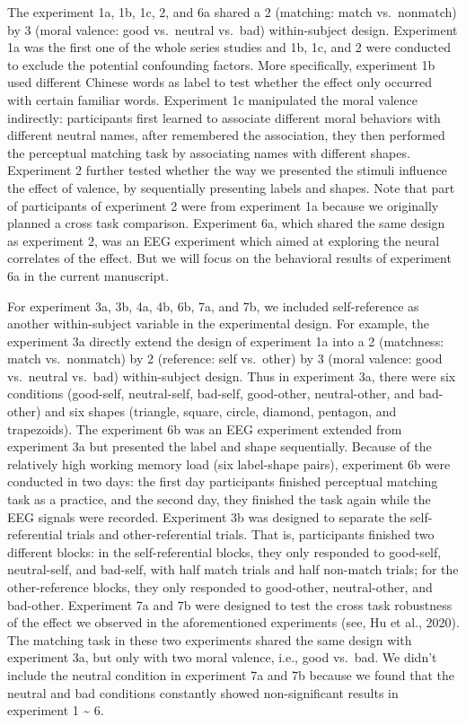 \documentclass[
  english,
  man]{apa6}
\begin{document}
The experiment 1a, 1b, 1c, 2, and 6a shared a 2 (matching: match vs.~nonmatch) by 3 (moral valence: good vs.~neutral vs.~bad) within-subject design. Experiment 1a was the first one of the whole series studies and 1b, 1c, and 2 were conducted to exclude the potential confounding factors. More specifically, experiment 1b used different Chinese words as label to test whether the effect only occurred with certain familiar words. Experiment 1c manipulated the moral valence indirectly: participants first learned to associate different moral behaviors with different neutral names, after remembered the association, they then performed the perceptual matching task by associating names with different shapes. Experiment 2 further tested whether the way we presented the stimuli influence the effect of valence, by sequentially presenting labels and shapes. Note that part of participants of experiment 2 were from experiment 1a because we originally planned a cross task comparison. Experiment 6a, which shared the same design as experiment 2, was an EEG experiment which aimed at exploring the neural correlates of the effect. But we will focus on the behavioral results of experiment 6a in the current manuscript.

For experiment 3a, 3b, 4a, 4b, 6b, 7a, and 7b, we included self-reference as another within-subject variable in the experimental design. For example, the experiment 3a directly extend the design of experiment 1a into a 2 (matchness: match vs.~nonmatch) by 2 (reference: self vs.~other) by 3 (moral valence: good vs.~neutral vs.~bad) within-subject design. Thus in experiment 3a, there were six conditions (good-self, neutral-self, bad-self, good-other, neutral-other, and bad-other) and six shapes (triangle, square, circle, diamond, pentagon, and trapezoids). The experiment 6b was an EEG experiment extended from experiment 3a but presented the label and shape sequentially. Because of the relatively high working memory load (six label-shape pairs), experiment 6b were conducted in two days: the first day participants finished perceptual matching task as a practice, and the second day, they finished the task again while the EEG signals were recorded. Experiment 3b was designed to separate the self-referential trials and other-referential trials. That is, participants finished two different blocks: in the self-referential blocks, they only responded to good-self, neutral-self, and bad-self, with half match trials and half non-match trials; for the other-reference blocks, they only responded to good-other, neutral-other, and bad-other. Experiment 7a and 7b were designed to test the cross task robustness of the effect we observed in the aforementioned experiments (see, Hu et al., 2020). The matching task in these two experiments shared the same design with experiment 3a, but only with two moral valence, i.e., good vs.~bad. We didn't include the neutral condition in experiment 7a and 7b because we found that the neutral and bad conditions constantly showed non-significant results in experiment 1 \textasciitilde{} 6.
\end{document}
